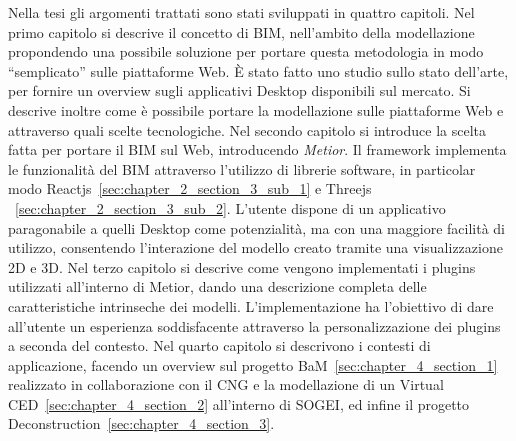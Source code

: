 Nella tesi gli argomenti trattati sono stati sviluppati in quattro capitoli.
Nel primo capitolo si descrive il concetto di BIM, nell’ambito della modellazione propondendo una possibile soluzione
per portare questa metodologia in modo ``semplicato'' sulle piattaforme Web.
\`E stato fatto uno studio sullo stato dell’arte, per fornire un overview
sugli applicativi Desktop disponibili sul mercato. Si descrive inoltre come è
possibile portare la modellazione sulle piattaforme Web e attraverso quali scelte tecnologiche.
Nel secondo capitolo si introduce la scelta fatta per portare il BIM sul Web, introducendo \emph{Metior}.
Il framework implementa le funzionalità del BIM attraverso l'utilizzo di librerie software,
in particolar modo Reactjs~\ref{sec:chapter_2_section_3_sub_1} e Threejs ~\ref{sec:chapter_2_section_3_sub_2}.
L'utente dispone di un applicativo paragonabile a quelli
Desktop come potenzialità, ma con una maggiore facilità di utilizzo, consentendo l'interazione del modello creato
tramite una visualizzazione 2D e 3D.
Nel terzo capitolo si descrive come vengono implementati i plugins utilizzati all'interno di Metior,
dando una descrizione completa delle caratteristiche intrinseche dei modelli. L'implementazione ha l'obiettivo
di dare all'utente un esperienza soddisfacente attraverso la personalizzazione dei plugins a seconda del contesto.
Nel quarto capitolo si descrivono i contesti di applicazione, facendo un overview sul progetto BaM~\ref{sec:chapter_4_section_1}
realizzato in collaborazione con il CNG e la modellazione di un Virtual CED~\ref{sec:chapter_4_section_2} all'interno di SOGEI, ed
infine il progetto Deconstruction~\ref{sec:chapter_4_section_3}.
